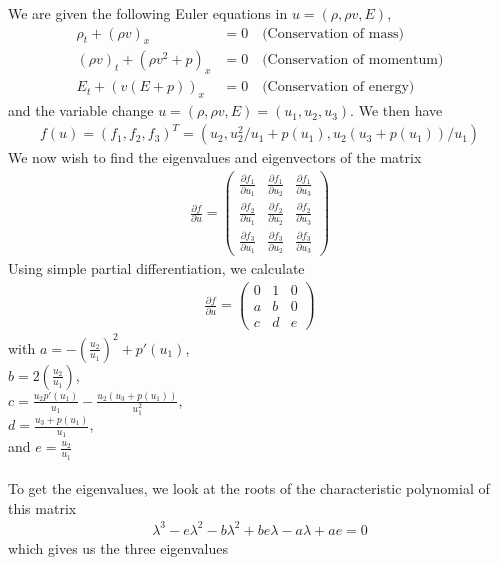 We are given the following Euler equations in $u=(\rho, \rho v, E)$, 
\begin{align}
	\rho_t + (\rho v)_x &= 0 \quad  \text{(Conservation of mass)} \\
	(\rho v)_t +(\rho v^2 + p)_x &= 0 \quad \text{(Conservation of momentum)} \\
	E_t + (v(E+p))_x &= 0 \quad \text{(Conservation of energy)}
\end{align}
and the variable change $u = (\rho, \rho v, E) = (u_1, u_2, u_3)$. We then have 
\begin{align*}
	f(u) = (f_1, f_2, f_3)^T = (u_2, u_2^2/u_1 + p(u_1), u_2(u_3+p(u_1))/u_1)
\end{align*}
We now wish to find the eigenvalues and eigenvectors of the matrix 
\begin{align*}
	\frac{\partial f}{\partial u} = \begin{pmatrix}
	\frac{\partial f_1}{\partial u_1} & \frac{\partial f_1}{\partial u_2} & \frac{\partial f_1}{\partial u_3} \\
	\frac{\partial f_2}{\partial u_1} & \frac{\partial f_2}{\partial u_2} & \frac{\partial f_2}{\partial u_3} \\
	\frac{\partial f_3}{\partial u_1} & \frac{\partial f_3}{\partial u_2} & \frac{\partial f_3}{\partial u_3}
	\end{pmatrix}
\end{align*} 
Using simple partial differentiation, we calculate 
\begin{align*}
	\frac{\partial f}{\partial u} = \begin{pmatrix}
	0 & 1 & 0 \\ 
	a & b & 0 \\ 
	c & d & e
	\end{pmatrix}
\end{align*}
with $a=-(\frac{u_2}{u_1})^2 + p'(u_1)$, \\
 $b=2(\frac{u_2}{u_1})$, \\
 $c=\frac{u_2 p'(u_1)}{u_1} - \frac{u_2(u_3 + p(u_1))}{u_1^2}$, \\
 $d = \frac{u_3 + p(u_1)}{u_1}$, \\
 and $e=\frac{u_2}{u_1}$
\\ \\
To get the eigenvalues, we look at the roots of the characteristic polynomial of this matrix 
\begin{align*}
	\lambda^3 -e \lambda^2 - b \lambda^2 + b e \lambda -a \lambda + a e = 0
\end{align*}
which gives us the three eigenvalues 
